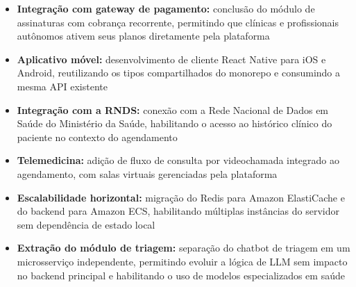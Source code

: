 \begin{itemize}
  \item \textbf{Integração com gateway de pagamento:}
        conclusão do módulo de assinaturas com
        cobrança recorrente, permitindo que clínicas
        e profissionais autônomos ativem seus planos
        diretamente pela plataforma

  \item \textbf{Aplicativo móvel:} desenvolvimento
        de cliente React Native para iOS e Android,
        reutilizando os tipos compartilhados do
        monorepo e consumindo a mesma API existente

  \item \textbf{Integração com a RNDS:} conexão com
        a Rede Nacional de Dados em Saúde do
        Ministério da Saúde, habilitando o acesso ao
        histórico clínico do paciente no contexto
        do agendamento

  \item \textbf{Telemedicina:} adição de fluxo de
        consulta por videochamada integrado ao
        agendamento, com salas virtuais gerenciadas
        pela plataforma

  \item \textbf{Escalabilidade horizontal:}
        migração do Redis para Amazon ElastiCache e
        do backend para Amazon ECS, habilitando
        múltiplas instâncias do servidor sem
        dependência de estado local

  \item \textbf{Extração do módulo de triagem:}
        separação do chatbot de triagem em um
        microsserviço independente, permitindo
        evoluir a lógica de LLM sem impacto no
        backend principal e habilitando o uso de
        modelos especializados em saúde
\end{itemize}